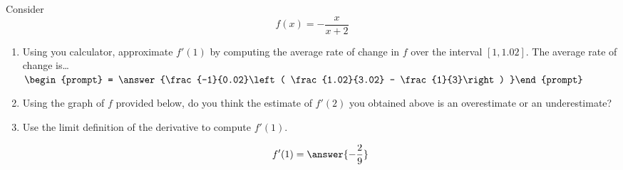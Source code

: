 \documentclass{ximera}
\author{Steven Gubkin}
\begin{document}
\begin{exercise}



Consider 
\[
f(x) = -\frac{x}{x+2}
\]



\begin{enumerate}
\item Using you calculator, approximate $f'(1)$ by computing the average rate of change in $f$ over the interval $[1,1.02]$.  The average rate of change is\dots  $\begin{prompt} = \answer{\frac{-1}{0.02}\left( \frac{1.02}{3.02} - \frac{1}{3}\right) }\end{prompt}$
\item Using the graph of $f$ provided below, do you think the estimate of $f'(2)$ you obtained above is an overestimate or an underestimate?

\begin{prompt}
\begin{multipleChoice}
\end{multipleChoice}
\end{prompt}

\begin{image}
\end{image}

\item Use the limit definition of the derivative to compute $f'(1)$.  \begin{prompt} $$f'(1) = \answer{-\frac{2}{9}}$$\end{prompt}
\end{enumerate}
\end{exercise}
\end{document}

